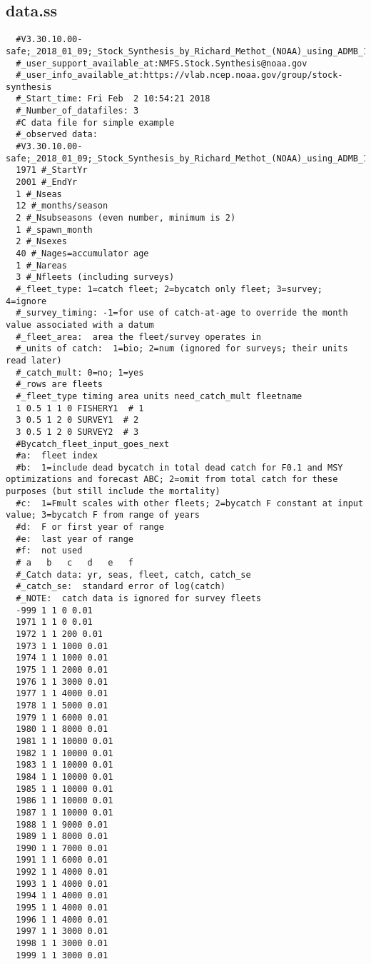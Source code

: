 \begin{landscape}
\subsection{data.ss}
\scriptsize{
\begin{verbatim}
  #V3.30.10.00-safe;_2018_01_09;_Stock_Synthesis_by_Richard_Methot_(NOAA)_using_ADMB_11.6
  #_user_support_available_at:NMFS.Stock.Synthesis@noaa.gov
  #_user_info_available_at:https://vlab.ncep.noaa.gov/group/stock-synthesis
  #_Start_time: Fri Feb  2 10:54:21 2018
  #_Number_of_datafiles: 3
  #C data file for simple example
  #_observed data: 
  #V3.30.10.00-safe;_2018_01_09;_Stock_Synthesis_by_Richard_Methot_(NOAA)_using_ADMB_11.6
  1971 #_StartYr
  2001 #_EndYr
  1 #_Nseas
  12 #_months/season
  2 #_Nsubseasons (even number, minimum is 2)
  1 #_spawn_month
  2 #_Nsexes
  40 #_Nages=accumulator age
  1 #_Nareas
  3 #_Nfleets (including surveys)
  #_fleet_type: 1=catch fleet; 2=bycatch only fleet; 3=survey; 4=ignore 
  #_survey_timing: -1=for use of catch-at-age to override the month value associated with a datum 
  #_fleet_area:  area the fleet/survey operates in 
  #_units of catch:  1=bio; 2=num (ignored for surveys; their units read later)
  #_catch_mult: 0=no; 1=yes
  #_rows are fleets
  #_fleet_type timing area units need_catch_mult fleetname
  1 0.5 1 1 0 FISHERY1  # 1
  3 0.5 1 2 0 SURVEY1  # 2
  3 0.5 1 2 0 SURVEY2  # 3
  #Bycatch_fleet_input_goes_next
  #a:  fleet index
  #b:  1=include dead bycatch in total dead catch for F0.1 and MSY optimizations and forecast ABC; 2=omit from total catch for these purposes (but still include the mortality)
  #c:  1=Fmult scales with other fleets; 2=bycatch F constant at input value; 3=bycatch F from range of years
  #d:  F or first year of range
  #e:  last year of range
  #f:  not used
  # a   b   c   d   e   f 
  #_Catch data: yr, seas, fleet, catch, catch_se
  #_catch_se:  standard error of log(catch)
  #_NOTE:  catch data is ignored for survey fleets
  -999 1 1 0 0.01
  1971 1 1 0 0.01
  1972 1 1 200 0.01
  1973 1 1 1000 0.01
  1974 1 1 1000 0.01
  1975 1 1 2000 0.01
  1976 1 1 3000 0.01
  1977 1 1 4000 0.01
  1978 1 1 5000 0.01
  1979 1 1 6000 0.01
  1980 1 1 8000 0.01
  1981 1 1 10000 0.01
  1982 1 1 10000 0.01
  1983 1 1 10000 0.01
  1984 1 1 10000 0.01
  1985 1 1 10000 0.01
  1986 1 1 10000 0.01
  1987 1 1 10000 0.01
  1988 1 1 9000 0.01
  1989 1 1 8000 0.01
  1990 1 1 7000 0.01
  1991 1 1 6000 0.01
  1992 1 1 4000 0.01
  1993 1 1 4000 0.01
  1994 1 1 4000 0.01
  1995 1 1 4000 0.01
  1996 1 1 4000 0.01
  1997 1 1 3000 0.01
  1998 1 1 3000 0.01
  1999 1 1 3000 0.01

\end{verbatim}}
\end{landscape}
